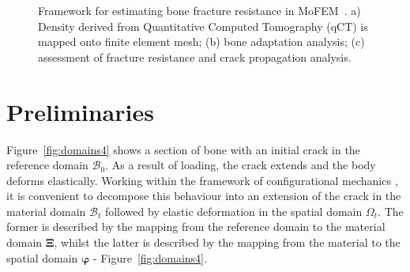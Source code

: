\documentclass[review]{elsarticle}
\numberwithin{equation}{section}
\begin{document}
\begin{figure}[h]
	\centering
\caption{Framework for estimating bone fracture resistance in MoFEM~\citep{mofem2017}. a) Density derived from Quantitative Computed Tomography (qCT) is mapped onto finite element mesh; (b) bone adaptation analysis; (c) assessment of fracture resistance and crack propagation analysis.}
\label{fig:framework}
\end{figure}

 
 \section{Preliminaries}
 \label{preliminaries}
Figure~\ref{fig:domains4} shows a section of bone with an initial crack in the reference domain $\mathscr{B}_{0}$. As a result of loading, the crack extends and the body deforms elastically. Working within the framework of configurational mechanics \citep{kienzler2014configurational,kaczmarczyk2014three}, it is convenient to decompose this behaviour into an extension of the crack in the material domain  $\mathscr{B}_t$ followed by elastic deformation  in the spatial domain $\Omega_t$. The former is described by the mapping from the reference  domain to the material domain ${\boldsymbol\Xi}$, whilst the latter is described by the mapping from the material to the spatial domain ${\boldsymbol\varphi}$ - Figure~\ref{fig:domains4}.
\end{document}
